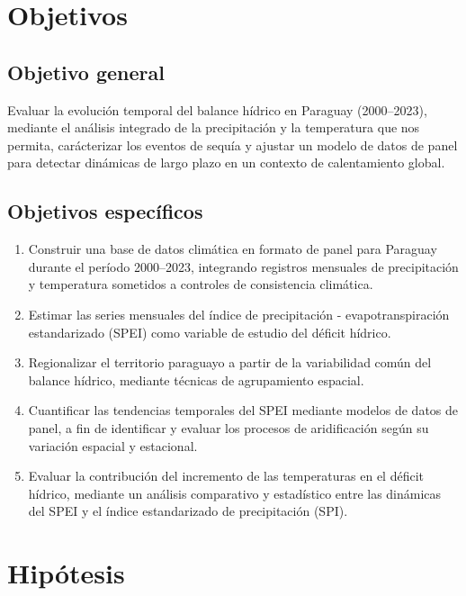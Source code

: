 \section{Objetivos}

\subsection{Objetivo general}

Evaluar la evolución temporal del balance hídrico en Paraguay (2000--2023), mediante el análisis integrado de la precipitación y la temperatura que nos permita, carácterizar los eventos de sequía y ajustar un modelo de datos de panel para detectar dinámicas de largo plazo en un contexto de calentamiento global.

\subsection{Objetivos específicos}
\begin{enumerate}
    \item Construir una base de datos climática en formato de panel para Paraguay durante el período 2000--2023, integrando registros mensuales de precipitación y temperatura sometidos a controles de consistencia climática.
    \item Estimar las series mensuales del índice de precipitación - evapotranspiración estandarizado (SPEI) como variable de estudio del déficit hídrico.
    \item Regionalizar el territorio paraguayo a partir de la variabilidad común del balance hídrico, mediante técnicas de agrupamiento espacial.
    \item Cuantificar las tendencias temporales del SPEI mediante modelos de datos de panel, a fin de identificar y evaluar los procesos de aridificación según su variación espacial y estacional.
    \item Evaluar la contribución del incremento de las temperaturas en el déficit hídrico, mediante un análisis comparativo y estadístico entre las dinámicas del SPEI y el índice estandarizado de precipitación (SPI).
\end{enumerate}

\section{Hipótesis}

